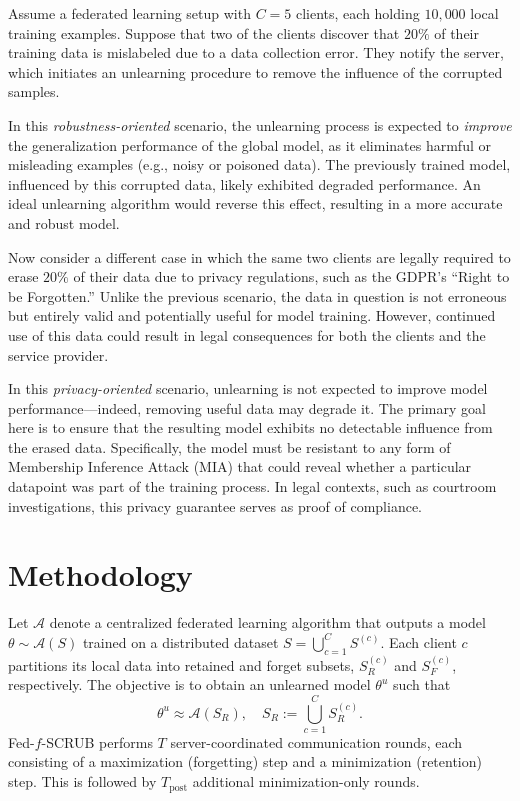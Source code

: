 \documentclass{article}
\begin{document}
Assume a federated learning setup with $C = 5$ clients, each holding $10{,}000$ local training examples. Suppose that two of the clients discover that $20\%$ of their training data is mislabeled due to a data collection error. They notify the server, which initiates an unlearning procedure to remove the influence of the corrupted samples.

In this \textit{robustness-oriented} scenario, the unlearning process is expected to \textit{improve} the generalization performance of the global model, as it eliminates harmful or misleading examples (e.g., noisy or poisoned data). The previously trained model, influenced by this corrupted data, likely exhibited degraded performance. An ideal unlearning algorithm would reverse this effect, resulting in a more accurate and robust model.

Now consider a different case in which the same two clients are legally required to erase $20\%$ of their data due to privacy regulations, such as the GDPR’s “Right to be Forgotten.” Unlike the previous scenario, the data in question is not erroneous but entirely valid and potentially useful for model training. However, continued use of this data could result in legal consequences for both the clients and the service provider.

In this \textit{privacy-oriented} scenario, unlearning is not expected to improve model performance—indeed, removing useful data may degrade it. The primary goal here is to ensure that the resulting model exhibits no detectable influence from the erased data. Specifically, the model must be resistant to any form of Membership Inference Attack (MIA) that could reveal whether a particular datapoint was part of the training process. In legal contexts, such as courtroom investigations, this privacy guarantee serves as proof of compliance.


\section{Methodology}

Let $\mathcal{A}$ denote a centralized federated learning algorithm that outputs a model $\theta \sim \mathcal{A}(S)$ trained on a distributed dataset $S = \bigcup_{c=1}^C S^{(c)}$. Each client $c$ partitions its local data into retained and forget subsets, $S_R^{(c)}$ and $S_F^{(c)}$, respectively. The objective is to obtain an unlearned model $\theta^u$ such that
\[
\theta^u \approx \mathcal{A}(S_R), \quad S_R := \bigcup_{c=1}^C S_R^{(c)}.
\]
Fed-$f$-SCRUB performs $T$ server-coordinated communication rounds, each consisting of a maximization (forgetting) step and a minimization (retention) step. This is followed by $T_{\text{post}}$ additional minimization-only rounds.
\end{document}
